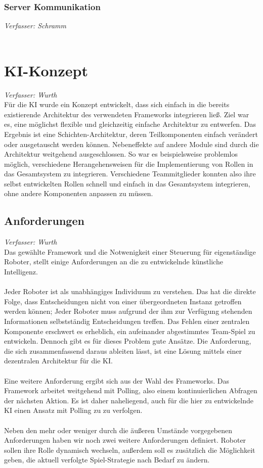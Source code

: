 \documentclass[fontsize=12pt,a4paper,final]{scrartcl}[2003/01/01]
\begin{document}
\subsubsection{Server Kommunikation}
\label{sec:server-communication}
\textit{Verfasser: Schramm}\\
\\


\section{KI-Konzept}
\textit{Verfasser: Wurth}\\

Für die KI wurde ein Konzept entwickelt, dass sich einfach in die bereits existierende Architektur des verwendeten Frameworks integrieren ließ. Ziel war es, eine möglichst flexible und gleichzeitig einfache Architektur zu entwerfen. Das Ergebnis ist eine Schichten-Architektur, deren Teilkomponenten einfach verändert oder ausgetauscht werden können. Nebeneffekte auf andere Module sind durch die Architektur weitgehend ausgeschlossen. So war es beispielsweise problemlos möglich, verschiedene Herangehensweisen für die Implementierung von Rollen in das Gesamtsystem zu integrieren. Verschiedene Teammitglieder konnten also ihre selbst entwickelten Rollen schnell und einfach in das Gesamtsystem integrieren, ohne andere Komponenten anpassen zu müssen.

\subsection{Anforderungen}
\textit{Verfasser: Wurth}\\

Das gewählte Framework und die Notwenigkeit einer Steuerung für eigenständige Roboter, stellt einige Anforderungen an die zu entwickelnde künstliche Intelligenz.\\
\\
Jeder Roboter ist als unabhängiges Individuum zu verstehen. Das hat die direkte Folge, dass Entscheidungen nicht von einer übergeordneten Instanz getroffen werden können; Jeder Roboter muss aufgrund der ihm zur Verfügung stehenden Informationen selbstständig Entscheidungen treffen. Das Fehlen einer zentralen Komponente erschwert es erheblich, ein aufeinander abgestimmtes Team-Spiel zu entwickeln. Dennoch gibt es für dieses Problem gute Ansätze. Die Anforderung, die sich zusammenfassend daraus ableiten lässt, ist eine Lösung mittels einer dezentralen Architektur für die KI.\\
\\
Eine weitere Anforderung ergibt sich aus der Wahl des Frameworks. Das Framework arbeitet weitgehend mit Polling, also einem kontinuierlichen Abfragen der nächsten Aktion. Es ist daher naheliegend, auch für die hier zu entwickelnde KI einen Ansatz mit Polling zu zu verfolgen.\\
\\
Neben den mehr oder weniger durch die äußeren Umstände vorgegebenen Anforderungen haben wir noch zwei weitere Anforderungen definiert. Roboter sollen ihre Rolle dynamisch wechseln, außerdem soll es zusätzlich die Möglichkeit geben, die aktuell verfolgte Spiel-Strategie nach Bedarf zu ändern.
\end{document}
